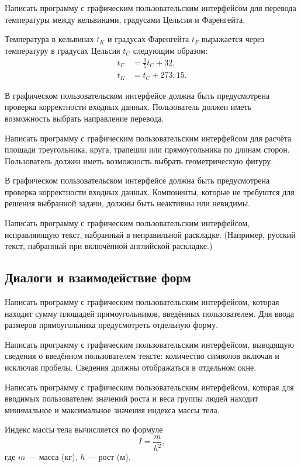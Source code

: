 \task Написать программу с графическим пользовательским интерфейсом
для перевода температуры между кельвинами, градусами Цельсия и
Фаренгейта.

Температура в кельвинах $t_K$ и градусах Фаренгейта $t_F$ выражается
через температуру в градусах Цельсия $t_C$ следующим образом:
\begin{align*}
  t_F &= \frac95 t_C + 32,\\
  t_K &= t_C + 273{,}15.
\end{align*}

В графическом пользовательском интерфейсе должна быть предусмотрена
проверка корректности входных данных. Пользователь должен иметь
возможность выбрать направление перевода.

\task Написать программу с графическим пользовательским интерфейсом
для расчёта площади треугольника, круга, трапеции или прямоугольника
по длинам сторон. Пользователь должен иметь возможность выбрать
геометрическую фигуру.

В графическом пользовательском интерфейсе должна быть предусмотрена
проверка корректности входных данных. Компоненты, которые не требуются
для решения выбранной задачи, должны быть неактивны или невидимы.

\task Написать программу с графическим пользовательским интерфейсом,
исправляющую текст, набранный в неправильной
раскладке. (Например, русский текст,
набранный при включённой английской раскладке.)


\subsection{Диалоги и взаимодействие форм}

\task Написать программу с графическим пользовательским интерфейсом,
которая находит сумму площадей прямоугольников, введённых
пользователем. Для ввода размеров прямоугольника предусмотреть
отдельную форму.

\task Написать программу с графическим пользовательским интерфейсом,
выводящую сведения о введённом пользователем тексте: количество
символов включая и исключая пробелы. Сведения должны отображаться в
отдельном окне.

\task Написать программу с графическим пользовательским интерфейсом,
которая для вводимых пользователем значений роста и веса группы людей
находит минимальное и максимальное значения индекса массы тела.

Индекс массы тела вычисляется по формуле
\[
I=\frac{m}{h^2},
\]
где $m$ — масса (кг), $h$ — рост (м).

